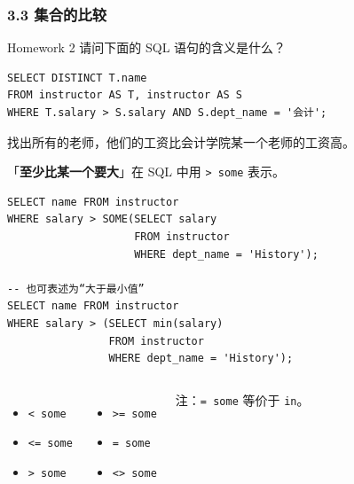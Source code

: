 \documentclass[aspectratio=169, 14pt]{beamer}
\begin{document}
\begin{frame}[fragile]
	\frametitle{3.3 集合的比较}
	\begin{block}{Homework 2}
		请问下面的 SQL 语句的含义是什么？

		\begin{verbatim}
SELECT DISTINCT T.name
FROM instructor AS T, instructor AS S
WHERE T.salary > S.salary AND S.dept_name = '会计';
\end{verbatim}
	\end{block}

	找出所有的老师，他们的工资比会计学院\alert{某一个}老师的工资高。
\end{frame}

\begin{frame}[fragile]
	「\textbf{至少比某一个要大}」在 SQL 中用 \texttt{> some} 表示。

	\begin{verbatim}
SELECT name FROM instructor
WHERE salary > SOME(SELECT salary
                    FROM instructor
                    WHERE dept_name = 'History');

-- 也可表述为“大于最小值”
SELECT name FROM instructor
WHERE salary > (SELECT min(salary)
                FROM instructor
                WHERE dept_name = 'History');
\end{verbatim}

\end{frame}

\begin{frame}[fragile]
	\begin{columns}
		\begin{itemize}
			\item \texttt{< some}
			\item \texttt{<= some}
			\item \texttt{> some}
		\end{itemize}
		\begin{itemize}
			\item \texttt{>= some}
			\item \texttt{= some}
			\item \texttt{<> some}
		\end{itemize}
		注：\texttt{= some} 等价于 \texttt{in}。
	\end{columns}

\end{frame}
\end{document}
